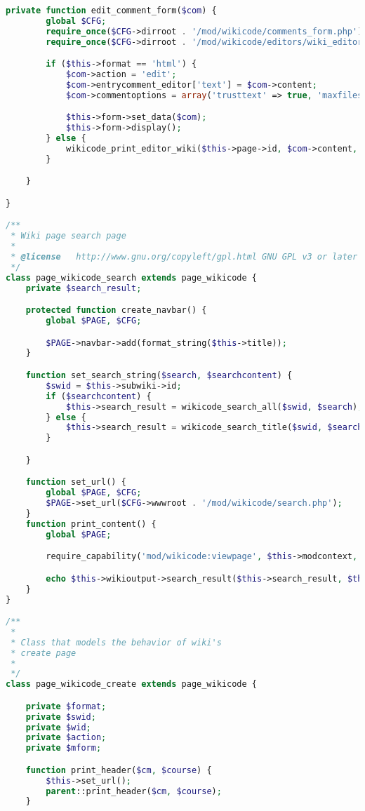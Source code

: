 \begin{lstlisting}[language=PHP]
    private function edit_comment_form($com) {
        global $CFG;
        require_once($CFG->dirroot . '/mod/wikicode/comments_form.php');
        require_once($CFG->dirroot . '/mod/wikicode/editors/wiki_editor.php');

        if ($this->format == 'html') {
            $com->action = 'edit';
            $com->entrycomment_editor['text'] = $com->content;
            $com->commentoptions = array('trusttext' => true, 'maxfiles' => 0);

            $this->form->set_data($com);
            $this->form->display();
        } else {
            wikicode_print_editor_wiki($this->page->id, $com->content, $this->format, -1, null, false, array(), 'editcomments', $com->id);
        }

    }

}

/**
 * Wiki page search page
 *
 * @license   http://www.gnu.org/copyleft/gpl.html GNU GPL v3 or later
 */
class page_wikicode_search extends page_wikicode {
    private $search_result;

    protected function create_navbar() {
        global $PAGE, $CFG;

        $PAGE->navbar->add(format_string($this->title));
    }

    function set_search_string($search, $searchcontent) {
        $swid = $this->subwiki->id;
        if ($searchcontent) {
            $this->search_result = wikicode_search_all($swid, $search);
        } else {
            $this->search_result = wikicode_search_title($swid, $search);
        }

    }

    function set_url() {
        global $PAGE, $CFG;
        $PAGE->set_url($CFG->wwwroot . '/mod/wikicode/search.php');
    }
    function print_content() {
        global $PAGE;

        require_capability('mod/wikicode:viewpage', $this->modcontext, NULL, true, 'noviewpagepermission', 'wikicode');

        echo $this->wikioutput->search_result($this->search_result, $this->subwiki);
    }
}

/**
 *
 * Class that models the behavior of wiki's
 * create page
 *
 */
class page_wikicode_create extends page_wikicode {

    private $format;
    private $swid;
    private $wid;
    private $action;
    private $mform;

    function print_header($cm, $course) {
        $this->set_url();
        parent::print_header($cm, $course);
    }


\end{lstlisting}
